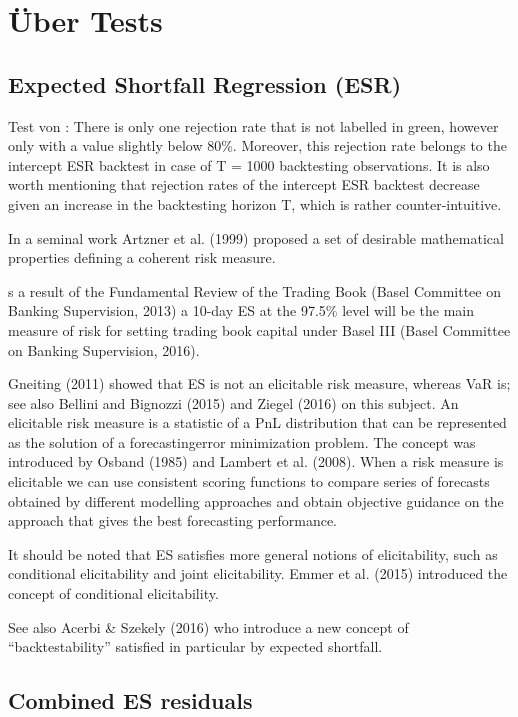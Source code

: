 \documentclass[12pt,a4paper]{article}
\begin{document}
	
	\section{Über Tests}
	\subsection{Expected Shortfall Regression (ESR)}
	Test von \cite{bayer_regression-based_2022}
	\cite{spring_backtesting_2021}:
	There is only one rejection rate that is not labelled in green, however only with a value slightly below 80\%. Moreover, this rejection rate belongs to the intercept ESR backtest in case of T = 1000 backtesting observations. It is also worth mentioning that rejection rates of the intercept ESR backtest decrease given an increase in the backtesting horizon T, which is rather counter-intuitive.
	
	In a seminal work Artzner et al. (1999) proposed a set of desirable mathematical properties defining a coherent risk measure.
	
	s a result of the Fundamental Review of the Trading Book (Basel Committee on Banking Supervision, 2013) a 10-day ES at the 97.5\% level will be the main measure of risk for setting trading book capital under Basel III (Basel Committee on Banking Supervision, 2016).
	
	Gneiting (2011) showed that ES is not an elicitable risk measure, whereas VaR is; see also Bellini and Bignozzi (2015) and Ziegel (2016) on this subject. An elicitable risk measure is a statistic of a PnL distribution that can be represented as the solution of a forecastingerror minimization problem. The concept was introduced by Osband (1985) and Lambert et al. (2008). When a risk measure is elicitable we can use consistent scoring functions to compare series of forecasts obtained by different modelling approaches and obtain objective guidance on the approach that gives the best forecasting performance.
	
	It should be noted that ES satisfies more general notions of elicitability, such as conditional elicitability and joint elicitability. Emmer et al. (2015) introduced the concept of conditional elicitability.
	
	
	
	See also Acerbi \& Szekely (2016) who introduce a new concept of “backtestability” satisfied in particular by expected shortfall.
	
	\subsection{Combined ES residuals}
	
\end{document}
